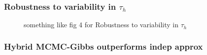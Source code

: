 \clearpage
\subsubsection{Robustness to variability in $\tau_h$}

\begin{figure}[h]
\centering
\begin{minipage}[c]{0.45\hsize}
\end{minipage}
\begin{minipage}[c]{0.45\hsize}
\end{minipage}
\caption{something like fig 4 for Robustness to variability in $\tau_h$}
\label{fig:mcmc-iid}
\end{figure}

\clearpage
\subsubsection{Hybrid MCMC-Gibbs outperforms indep approx}

